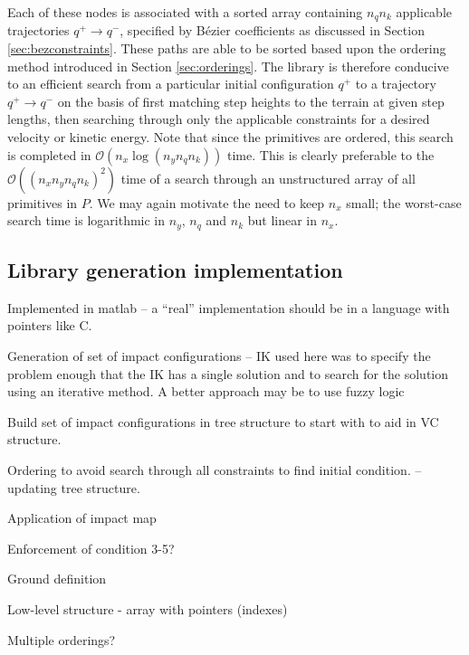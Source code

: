Each of these nodes is associated with a sorted array containing $n_qn_k$ applicable trajectories $q^+ \to q^-$, specified by Bézier coefficients as discussed in Section \ref{sec:bezconstraints}. These paths are able to be sorted based upon the ordering method introduced in Section \ref{sec:orderings}. The library is therefore conducive to an efficient search from a particular initial configuration $q^+$ to a trajectory $q^+ \to q^-$ on the basis of first matching step heights to the terrain at given step lengths, then searching through only the applicable constraints for a desired velocity or kinetic energy. Note that since the primitives are ordered, this search is completed in $\mathcal{O}(n_x\log(n_yn_qn_k))$ time. This is clearly preferable to the $\mathcal{O}\left((n_xn_yn_qn_k)^2\right)$ time of a search through an unstructured array of all primitives in $P$. We may again motivate the need to keep $n_x$ small; the worst-case search time is logarithmic in $n_y$, $n_q$ and $n_k$ but linear in $n_x$.

\subsection{Library generation implementation}
Implemented in matlab -- a ``real'' implementation should be in a language with pointers like C.

Generation of set of impact configurations -- IK used here was to specify the problem enough that the IK has a single solution and to search for the solution using an iterative method. A better approach may be to use fuzzy logic \cite{something?}

Build set of impact configurations in tree structure to start with to aid in VC structure.

Ordering to avoid search through all constraints to find initial condition. -- updating tree structure.

Application of impact map

Enforcement of condition 3-5?

Ground definition

Low-level structure - array with pointers (indexes)

Multiple orderings?